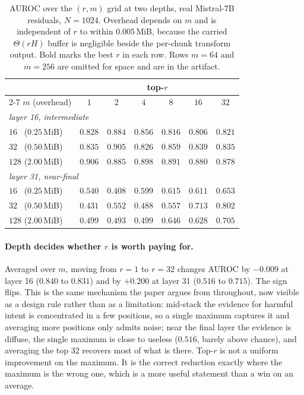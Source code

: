 \documentclass[10pt]{article}
\theoremstyle{plain}
\theoremstyle{definition}
\theoremstyle{remark}
\begin{document}
\begin{table}[!ht]
\centering\small
\begin{tabular}{lcccccc}
\toprule
& \multicolumn{6}{c}{top-$r$}\\
\cmidrule(lr){2-7}
$m$ (overhead) & $1$ & $2$ & $4$ & $8$ & $16$ & $32$\\
\midrule
\multicolumn{7}{l}{\emph{layer 16, intermediate}}\\
$16$ \ ($0.25$\,MiB)  & $0.828$ & $\mathbf{0.884}$ & $0.856$ & $0.816$ & $0.806$ & $0.821$\\
$32$ \ ($0.50$\,MiB)  & $0.835$ & $\mathbf{0.905}$ & $0.826$ & $0.859$ & $0.839$ & $0.835$\\
$128$ ($2.00$\,MiB)   & $\mathbf{0.906}$ & $0.885$ & $0.898$ & $0.891$ & $0.880$ & $0.878$\\
\midrule
\multicolumn{7}{l}{\emph{layer 31, near-final}}\\
$16$ \ ($0.25$\,MiB)  & $0.540$ & $0.408$ & $0.599$ & $0.615$ & $0.611$ & $\mathbf{0.653}$\\
$32$ \ ($0.50$\,MiB)  & $0.431$ & $0.552$ & $0.488$ & $0.557$ & $0.713$ & $\mathbf{0.802}$\\
$128$ ($2.00$\,MiB)   & $0.499$ & $0.493$ & $0.499$ & $0.646$ & $0.628$ & $\mathbf{0.705}$\\
\bottomrule
\end{tabular}
\caption{AUROC over the $(r,m)$ grid at two depths, real Mistral-7B residuals,
$N{=}1024$. Overhead depends on $m$ and is independent of $r$ to within $0.005$\,MiB,
because the carried $\Theta(rH)$ buffer is negligible beside the per-chunk transform
output. Bold marks the best $r$ in each row. Rows $m{=}64$ and $m{=}256$ are omitted for
space and are in the artifact.}
\label{tab:pareto}
\end{table}

\paragraph{Depth decides whether $r$ is worth paying for.} Averaged over $m$, moving from
$r{=}1$ to $r{=}32$ changes AUROC by $-0.009$ at layer 16 ($0.840$ to $0.831$) and by
$+0.200$ at layer 31 ($0.516$ to $0.715$). The sign flips. This is the same mechanism the
paper argues from throughout, now visible as a design rule rather than as a limitation:
mid-stack the evidence for harmful intent is concentrated in a few positions, so a single
maximum captures it and averaging more positions only admits noise; near the final layer
the evidence is diffuse, the single maximum is close to useless ($0.516$, barely above
chance), and averaging the top $32$ recovers most of what is there. Top-$r$ is not a
uniform improvement on the maximum. It is the correct reduction exactly where the maximum
is the wrong one, which is a more useful statement than a win on an average.
\end{document}
